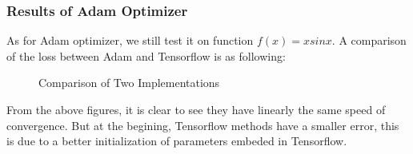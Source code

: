 \documentclass{article}
\begin{document}
\subsubsection{Results of Adam Optimizer}
As for Adam optimizer, we still test it on function $f(x)=xsinx$. A comparison of the loss between Adam and Tensorflow is as following:
\begin{figure}[H]
	\centering
	\caption{Comparison of Two Implementations}
	\label{fig2}
\end{figure}
From the above figures, it is clear to see they have linearly the same speed of convergence. But at the begining, Tensorflow methods have a smaller error, this is due to a better initialization of parameters embeded in Tensorflow. 
\end{document}
